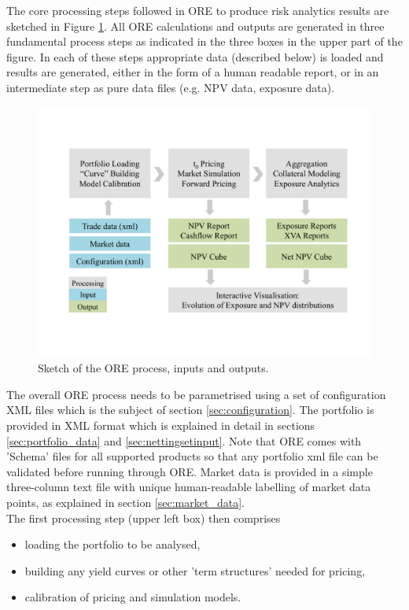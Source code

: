 \documentclass[12pt, a4paper]{article}
\begin{document}
The core processing steps followed in ORE to produce risk analytics results are sketched in Figure \ref{fig_process}.
All ORE calculations and outputs are generated in three fundamental process steps as indicated in the three boxes in the
upper part of the figure. In each of these steps appropriate data (described below) is loaded and results are generated,
either in the form of a human readable report, or in an intermediate step as pure data files (e.g. NPV data, exposure data).
\begin{figure}[h]
\begin{center}
\includegraphics[scale=0.6]{process.pdf}
\end{center}
\caption{Sketch of the ORE process, inputs and outputs. }
\label{fig_process}
\end{figure}

The overall ORE process needs to be parametrised using a set of configuration XML files which is the subject of section
\ref{sec:configuration}. The portfolio is provided in XML format which is explained in detail in sections
\ref{sec:portfolio_data} and \ref{sec:nettingsetinput}. Note that ORE comes with 'Schema' files for all supported
products so that any portfolio xml file can be validated before running through ORE. Market data is provided in a simple
three-column text file with unique human-readable labelling of market data points, as explained in section
\ref{sec:market_data}.  \\

The first processing step (upper left box) then comprises 
\begin{itemize}
\item loading the portfolio to be analysed, 
\item building any yield curves or other 'term structures' needed for pricing, 
\item calibration of pricing and simulation models.
\end{itemize}
\end{document}
